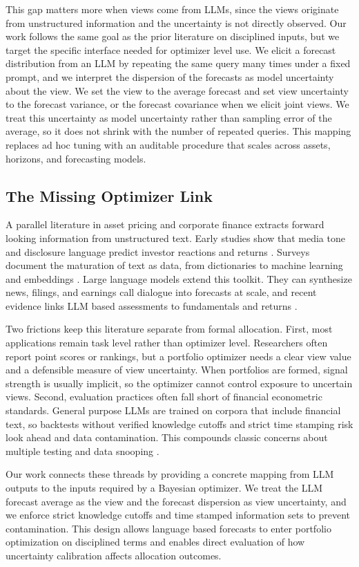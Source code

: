 This gap matters more when views come from LLMs, since the views originate from unstructured information and the uncertainty is not directly observed. Our work follows the same goal as the prior literature on disciplined inputs, but we target the specific interface needed for optimizer level use. We elicit a forecast distribution from an LLM by repeating the same query many times under a fixed prompt, and we interpret the dispersion of the forecasts as model uncertainty about the view. We set the view to the average forecast and set view uncertainty to the forecast variance, or the forecast covariance when we elicit joint views. We treat this uncertainty as model uncertainty rather than sampling error of the average, so it does not shrink with the number of repeated queries. This mapping replaces ad hoc tuning with an auditable procedure that scales across assets, horizons, and forecasting models.

\subsection{The Missing Optimizer Link}
A parallel literature in asset pricing and corporate finance extracts forward looking information from unstructured text. Early studies show that media tone and disclosure language predict investor reactions and returns \citep{tetlock2007giving, tetlock2008more, loughran2011liability}. Surveys document the maturation of text as data, from dictionaries to machine learning and embeddings \citep{gentzkow2019text, hwang2025deep}. Large language models extend this toolkit. They can synthesize news, filings, and earnings call dialogue into forecasts at scale, and recent evidence links LLM based assessments to fundamentals and returns \citep{lopez2023can, liu2023fingpt, lee2025your}.

Two frictions keep this literature separate from formal allocation. First, most applications remain task level rather than optimizer level. Researchers often report point scores or rankings, but a portfolio optimizer needs a clear view value and a defensible measure of view uncertainty. When portfolios are formed, signal strength is usually implicit, so the optimizer cannot control exposure to uncertain views. Second, evaluation practices often fall short of financial econometric standards. General purpose LLMs are trained on corpora that include financial text, so backtests without verified knowledge cutoffs and strict time stamping risk look ahead and data contamination. This compounds classic concerns about multiple testing and data snooping \citep{bender2021dangers, drinkall2024time, kong2025fusing}.

Our work connects these threads by providing a concrete mapping from LLM outputs to the inputs required by a Bayesian optimizer. We treat the LLM forecast average as the view and the forecast dispersion as view uncertainty, and we enforce strict knowledge cutoffs and time stamped information sets to prevent contamination. This design allows language based forecasts to enter portfolio optimization on disciplined terms and enables direct evaluation of how uncertainty calibration affects allocation outcomes.

